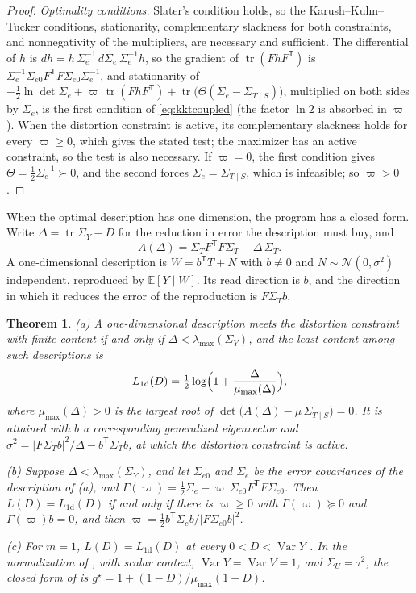 \documentclass[11pt,onecolumn]{IEEEtran}
\newtheorem{theorem}{Theorem}
\newcommand{\E}{\mathbb{E}}
\newcommand{\tr}{\operatorname{tr}}
\begin{document}
\begin{proof}
\emph{Optimality conditions.} Slater's condition holds, so the
Karush--Kuhn--Tucker conditions, stationarity, complementary slackness for
both constraints, and nonnegativity of the multipliers, are necessary and
sufficient. The differential of $h$ is
$dh=h\,\Sigma_e^{-1}\,d\Sigma_e\,\Sigma_e^{-1}h$, so the gradient of
$\tr(FhF^{\mathsf T})$ is
$\Sigma_e^{-1}\Sigma_{e0}F^{\mathsf T}F\Sigma_{e0}\Sigma_e^{-1}$, and
stationarity of
$-\tfrac12\ln\det\Sigma_e+\varpi\,\tr(FhF^{\mathsf T})
+\tr\bigl(\Theta(\Sigma_e-\Sigma_{T\mid S})\bigr)$, multiplied on both
sides by $\Sigma_e$, is the first condition of \eqref{eq:kktcoupled}
(the factor $\ln2$ is absorbed in $\varpi$). When the distortion constraint
is active, its complementary slackness holds for every $\varpi\ge0$, which
gives the stated test; the maximizer has an active constraint, so the test
is also necessary. If $\varpi=0$, the first condition gives
$\Theta=\tfrac12\Sigma_e^{-1}\succ0$, and the second forces
$\Sigma_e=\Sigma_{T\mid S}$, which is infeasible; so $\varpi>0$.
\end{proof}

When the optimal description has one dimension, the program has a
closed form. Write $\Delta=\tr\Sigma_Y-D$ for the reduction in error the
description must buy, and
\[
A(\Delta)=\Sigma_TF^{\mathsf T}F\Sigma_T-\Delta\,\Sigma_T .
\]
A one-dimensional description is $W=b^{\mathsf T}T+N$ with $b\ne0$ and
$N\sim\mathcal N(0,\sigma^2)$ independent, reproduced by $\E[Y\mid W]$.
Its read direction is $b$, and the direction in which it reduces the
error of the reproduction is $F\Sigma_Tb$.

\begin{theorem}\label{thm:onedim}
(a) A one-dimensional description meets the distortion constraint with
finite content if and only if $\Delta<\lambda_{\max}(\Sigma_Y)$, and the
least content among such descriptions is
\begin{equation}
L_{\mathrm{1d}}(D)=\tfrac12\log\Bigl(1+\frac{\Delta}{\mu_{\max}(\Delta)}\Bigr),
\label{eq:onedim}
\end{equation}
where $\mu_{\max}(\Delta)>0$ is the largest root of
$\det\bigl(A(\Delta)-\mu\,\Sigma_{T\mid S}\bigr)=0$. It is attained with $b$
a corresponding generalized eigenvector and
$\sigma^2=|F\Sigma_Tb|^2/\Delta-b^{\mathsf T}\Sigma_Tb$, at which the
distortion constraint is active.

(b) Suppose $\Delta<\lambda_{\max}(\Sigma_Y)$, and let $\Sigma_{e0}$ and $\Sigma_e$ be the error covariances of the
description of (a), and
$\Gamma(\varpi)=\tfrac12\Sigma_e-\varpi\,\Sigma_{e0}F^{\mathsf T}F\Sigma_{e0}$.
Then $L(D)=L_{\mathrm{1d}}(D)$ if and only if there is $\varpi\ge0$ with
$\Gamma(\varpi)\succeq0$ and $\Gamma(\varpi)b=0$, and then
$\varpi=\tfrac12b^{\mathsf T}\Sigma_eb/|F\Sigma_{e0}b|^2$.

(c) For $m=1$, $L(D)=L_{\mathrm{1d}}(D)$ at every $0<D<\operatorname{Var}Y$
\cite[Proposition~24]{bond2026tit}. In the normalization of
\cite[Section~III]{bond2026tit}, with scalar context,
$\operatorname{Var}Y=\operatorname{Var}V=1$, and $\Sigma_U=\tau^2$, the
closed form of \cite[Theorem~14(a)]{bond2026tit} is
$g^\star=1+(1-D)/\mu_{\max}(1-D)$.
\end{theorem}
\end{document}
